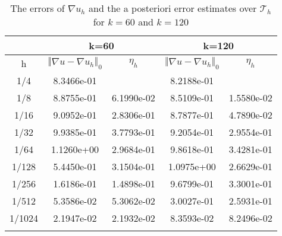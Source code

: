 \documentclass[leqno,final]{siamltex}
\numberwithin{equation}{section}
\newcommand{\norm}[1]{\left\Vert#1\right\Vert}
\newcommand{\na}{\nabla}
\newcommand{\T}{\mathcal{T}}
\begin{document}
\begin{table}
\begin{center}
\begin{tabular}{|c|cc|cc|}
\hline\noalign{\smallskip}
&\multicolumn{2}{|c|}{k=60}& \multicolumn{2}{|c|}{k=120}\\
\hline\noalign{\smallskip}
h & $\norm{\na u-\na u_h}_0$ & $\eta_h$ & $\norm{\na u-\na u_h}_0$ & $\eta_h$  \\
\noalign{\smallskip}\hline\noalign{\smallskip}
1/4 &    8.3466e-01 &            & 8.2188e-01 &           \\
1/8 &    8.8755e-01 & 6.1990e-02 & 8.5109e-01 & 1.5580e-02\\
1/16 &   9.0952e-01 & 2.8306e-01 & 8.7877e-01 & 4.7890e-02\\
1/32 &   9.9385e-01 & 3.7793e-01 & 9.2054e-01 & 2.9554e-01\\
1/64 &   1.1260e+00 & 2.9684e-01 & 9.8618e-01 & 3.4281e-01\\
1/128 &  5.4450e-01 & 3.1504e-01 & 1.0975e+00 & 2.6629e-01\\
1/256 &  1.6186e-01 & 1.4898e-01 & 9.6799e-01 & 3.3001e-01\\
1/512 &  5.3586e-02 & 5.3062e-02 & 3.0027e-01 & 2.5931e-01\\
1/1024 & 2.1947e-02 & 2.1932e-02 & 8.3593e-02 & 8.2496e-02\\
\noalign{\smallskip}\hline
\end{tabular}
\caption{The errors of $\na u_h$ and the a posteriori error estimates over $\T_h$ for $k=60$ and $k=120$}
\label{tab4}
\end{center}
\end{table}
\end{document}
